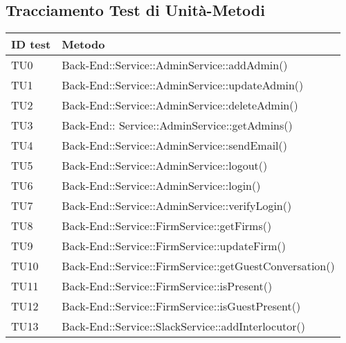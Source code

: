 \documentclass[../PianoDiQualifica.tex]{subfiles}
\begin{document}
	\newpage
	\subsection{Tracciamento Test di Unità-Metodi}
	\begin{longtable}[c] { >{\centering\arraybackslash}p{3cm} >{\centering\arraybackslash}p{9.5cm}}
		\toprule
		\centerline{\textbf{ID test}} & \centerline{\textbf{Metodo}}  \\
			\midrule
			TU0 & Back-End::Service::AdminService::addAdmin() \\
			\addlinespace[0.3em]
			\midrule
			\addlinespace[0.3em]
			TU1 & Back-End::Service::AdminService::updateAdmin() \\ 
			\addlinespace[0.3em]
			\midrule
			\addlinespace[0.3em]
			TU2 & Back-End::Service::AdminService::deleteAdmin() \\
			\addlinespace[0.3em]
			\midrule
			\addlinespace[0.3em]
			TU3 &Back-End:: Service::AdminService::getAdmins() \\ 
			\addlinespace[0.3em]
			\midrule
			\addlinespace[0.3em]
			TU4 & Back-End::Service::AdminService::sendEmail() \\ 
			\addlinespace[0.3em]
			\midrule
			\addlinespace[0.3em]
			TU5 & Back-End::Service::AdminService::logout() \\
			\addlinespace[0.3em]
			\midrule
			\addlinespace[0.3em]
			TU6 & Back-End::Service::AdminService::login() \\	
			\addlinespace[0.3em]
			\midrule
			\addlinespace[0.3em]		
			TU7 & Back-End::Service::AdminService::verifyLogin() \\ 
			\addlinespace[0.3em]
			\midrule
			\addlinespace[0.3em]
			TU8 & Back-End::Service::FirmService::getFirms() \\
			\addlinespace[0.3em]
			\midrule
			\addlinespace[0.3em]
			TU9 & Back-End::Service::FirmService::updateFirm() \\ 
			\addlinespace[0.3em]
			\midrule
			\addlinespace[0.3em]
			TU10 & Back-End::Service::FirmService::getGuestConversation() \\
			\addlinespace[0.3em]
			\midrule
			\addlinespace[0.3em]
			TU11 & Back-End::Service::FirmService::isPresent() \\
			\addlinespace[0.3em]
			\midrule
			\addlinespace[0.3em]
			TU12 & Back-End::Service::FirmService::isGuestPresent() \\
			\addlinespace[0.3em]
			\midrule
			\addlinespace[0.3em]
			TU13 & Back-End::Service::SlackService::addInterlocutor() \\

\end{longtable}
\end{document}
